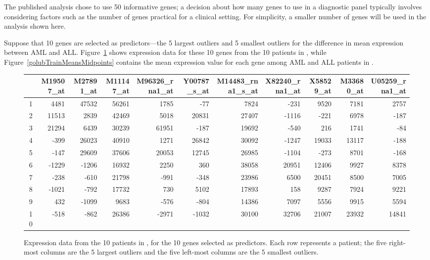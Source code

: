 The published analysis chose to use 50 informative genes; a decision about how many genes to use in a diagnostic panel typically involves considering factors such as the number of genes practical for a clinical setting. For simplicity, a smaller number of genes will be used in the analysis shown here. 

Suppose that 10 genes are selected as predictors---the 5 largest outliers and 5 smallest outliers for the difference in mean expression between AML and ALL. Figure~\ref{golubTestData} shows expression data for these 10 genes from the 10 patients in , while Figure~\ref{golubTrainMeansMidpoints} contains the mean expression value for each gene among AML and ALL patients in .

\textD{\newpage}

\begin{figure}[h]
	\tiny
	\centering
	\begin{tabular}{r|rrrrr|rrrrr}
		\hline
		& M19507\_at & M27891\_at & M11147\_at & M96326\_rna1\_at & Y00787\_s\_at & M14483\_rna1\_s\_at & X82240\_rna1\_at & X58529\_at & M33680\_at & U05259\_rna1\_at \\ 
		\hline
		1 & 4481 & 47532 & 56261 & 1785 & -77 & 7824 & -231 & 9520 & 7181 & 2757 \\ 
		2 & 11513 & 2839 & 42469 & 5018 & 20831 & 27407 & -1116 & -221 & 6978 & -187 \\ 
		3 & 21294 & 6439 & 30239 & 61951 & -187 & 19692 & -540 & 216 & 1741 & -84 \\ 
		4 & -399 & 26023 & 40910 & 1271 & 26842 & 30092 & -1247 & 19033 & 13117 & -188 \\ 
		5 & -147 & 29609 & 37606 & 20053 & 12745 & 26985 & -1104 & -273 & 8701 & -168 \\ 
		6 & -1229 & -1206 & 16932 & 2250 & 360 & 38058 & 20951 & 12406 & 9927 & 8378 \\ 
		7 & -238 & -610 & 21798 & -991 & -348 & 23986 & 6500 & 20451 & 8500 & 7005 \\ 
		8 & -1021 & -792 & 17732 & 730 & 5102 & 17893 & 158 & 9287 & 7924 & 9221 \\ 
		9 & 432 & -1099 & 9683 & -576 & -804 & 14386 & 7097 & 5556 & 9915 & 5594 \\ 
		10 & -518 & -862 & 26386 & -2971 & -1032 & 30100 & 32706 & 21007 & 23932 & 14841 \\ 
		\hline
	\end{tabular}
	\caption{Expression data from the 10 patients in , for the 10 genes selected as predictors. Each row represents a patient; the five right-most columns are the 5 largest outliers and the five left-most columns are the 5 smallest outliers.}
	\label{golubTestData}
\end{figure}

